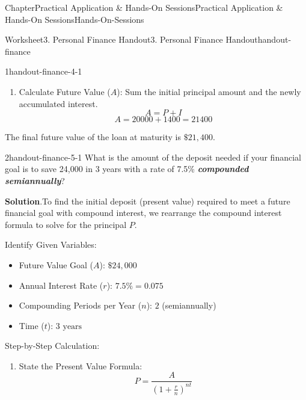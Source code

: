 \documentclass[oneside,10pt,]{book}
\newcommand{\blocktitlefont}{\relax}
\newcommand{\ptxlistdisc}{\raisebox{0.3ex}{\textbullet}}
\newcommand{\alert}[1]{\textbf{\textit{#1}}}
\begin{document}
\begin{chapterptx}{Chapter}{Practical Application \& Hands-On Sessions}{}{Practical Application \& Hands-On Sessions}{}{}{Hands-On-Sessions}
\begin{worksheet-section}{Worksheet}{3. Personal Finance Handout}{}{3. Personal Finance Handout}{}{}{handout-finance}
\begin{divisionexercise}{1}{}{}{handout-finance-4-1}
\begin{enumerate}[label={(\alph*)}]
\begin{equation*}
\end{equation*}
%
\begin{equation*}
I = 20000 \cdot 0.12 \cdot \left(\frac{7}{12}\right)
\end{equation*}
%
\begin{equation*}
I = 20000 \cdot 0.07 = 1400
\end{equation*}
The total accumulated interest generated over the 7 months is \(\$1,400\).%
\item{}Calculate Future Value (\(A\)): Sum the initial principal amount and the newly accumulated interest.%
\begin{equation*}
A = P + I
\end{equation*}
%
\begin{equation*}
A = 20000 + 1400 = 21400
\end{equation*}
%
\end{enumerate}
%
\par
The final future value of the loan at maturity is \(\$21,400\).%
\end{divisionexercise}%
\clearpage
\begin{divisionexercise}{2}{}{}{handout-finance-5-1}%
What is the amount of the deposit needed if your financial goal is to save \textdollar{}24,000 in 3 years with a rate of 7.5\% \alert{compounded semiannually}?%
\par\smallskip%
\noindent\textbf{\blocktitlefont Solution}.\hypertarget{handout-finance-5-1-2}{}\quad{}To find the initial deposit (present value) required to meet a future financial goal with compound interest, we rearrange the compound interest formula to solve for the principal \(P\).%
\par
Identify Given Variables:%
\begin{itemize}[label=\ptxlistdisc]
\item{}Future Value Goal (\(A\)): \(\$24,000\)%
\item{}Annual Interest Rate (\(r\)): \(7.5\% = 0.075\)%
\item{}Compounding Periods per Year (\(n\)): \(2\) (semiannually)%
\item{}Time (\(t\)): \(3 \text{ years}\)%
\end{itemize}
%
\par
Step-by-Step Calculation:%
\begin{enumerate}[label={(\alph*)}]
\item{}State the Present Value Formula:%
\begin{equation*}
P = \frac{A}{\left(1 + \frac{r}{n}\right)^{nt}}

\end{equation*}
\end{enumerate}
\end{divisionexercise}
\end{worksheet-section}
\end{chapterptx}
\end{document}
